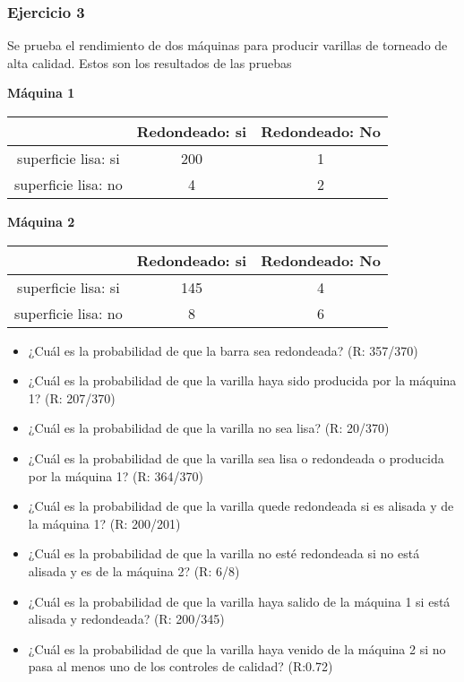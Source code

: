 \documentclass[
]{book}
\providecommand{\tightlist}{%
  \setlength{\itemsep}{0pt}\setlength{\parskip}{0pt}}
\begin{document}
\hypertarget{ejercicio-3-1}{%
\subsubsection{Ejercicio 3}\label{ejercicio-3-1}}

Se prueba el rendimiento de dos máquinas para producir varillas de torneado de alta calidad. Estos son los resultados de las pruebas

\textbf{Máquina 1}

\begin{longtable}[]{@{}ccc@{}}
\toprule
& Redondeado: si & Redondeado: No \\
\midrule
\endhead
superficie lisa: si & 200 & 1 \\
superficie lisa: no & 4 & 2 \\
\bottomrule
\end{longtable}

\textbf{Máquina 2}

\begin{longtable}[]{@{}ccc@{}}
\toprule
& Redondeado: si & Redondeado: No \\
\midrule
\endhead
superficie lisa: si & 145 & 4 \\
superficie lisa: no & 8 & 6 \\
\bottomrule
\end{longtable}

\begin{itemize}
\tightlist
\item
  ¿Cuál es la probabilidad de que la barra sea redondeada? (R: 357/370)
\item
  ¿Cuál es la probabilidad de que la varilla haya sido producida por la máquina 1? (R: 207/370)
\item
  ¿Cuál es la probabilidad de que la varilla no sea lisa? (R: 20/370)
\item
  ¿Cuál es la probabilidad de que la varilla sea lisa o redondeada o producida por la máquina 1? (R: 364/370)
\item
  ¿Cuál es la probabilidad de que la varilla quede redondeada si es alisada y de la máquina 1? (R: 200/201)
\item
  ¿Cuál es la probabilidad de que la varilla no esté redondeada si no está alisada y es de la máquina 2? (R: 6/8)
\item
  ¿Cuál es la probabilidad de que la varilla haya salido de la máquina 1 si está alisada y redondeada? (R: 200/345)
\item
  ¿Cuál es la probabilidad de que la varilla haya venido de la máquina 2 si no pasa al menos uno de los controles de calidad? (R:0.72)
\end{itemize}
\end{document}
